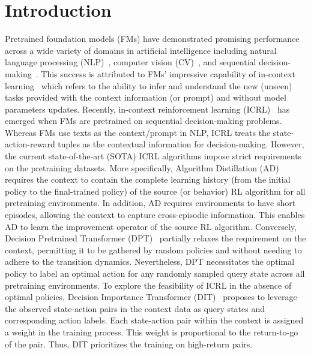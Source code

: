 \documentclass[10pt]{article}
\begin{document}
\section{Introduction}
Pretrained foundation models (FMs) have demonstrated promising performance across a wide variety of domains in artificial intelligence including natural language processing (NLP)~\citep{devlin2018bert, radford2018improving, radford2019language, brown2020language}, computer vision (CV)~\citep{yuan2021florence, sammani2022nlx, ma2023crepe, chen2024internvl}, and sequential decision-making~\citep{chen2021decision, janner2021offline, xu2022prompting, yang2023foundation, light2024strategist, light2024pianist}. This success is attributed to FMs' impressive capability of in-context learning~\citep{dong2022survey, li2023transformers, wei2023larger, wies2024learnability} which refers to the ability to infer and understand the new (unseen) tasks provided with the context information (or prompt) and without model parameters updates.
Recently, in-context reinforcement learning (ICRL)~\citep{laskin2022context, grigsby2023amago, lin2023transformers, sinii2023context, zisman2023emergence, lee2024supervised, lu2024structured, wang2024transformers, dong2024context} has emerged when FMs are pretrained on sequential decision-making problems.
Whereas FMs use texts as the context/prompt in NLP, ICRL treats the state-action-reward tuples as the contextual information for decision-making.
However, the current state-of-the-art (SOTA) ICRL algorithms impose strict requirements on the pretraining datasets. More specifically, Algorithm Distillation (AD)~\citep{laskin2022context} requires the context to contain the complete learning history (from the initial policy to the final-trained policy) of the source (or behavior) RL algorithm for all pretraining environments. In addition, AD requires environments to have short episodes, allowing the context to capture cross-episodic information. This enables AD to learn the improvement operator of the source RL algorithm.
Conversely, Decision Pretrained Transformer (DPT)~\citep{lee2024supervised} {partially relaxes the} requirement on the context, permitting it to be gathered by random policies and without needing to adhere to the transition dynamics. Nevertheless, DPT necessitates the optimal policy to label an optimal action for any randomly sampled query state across all pretraining environments.
To explore the feasibility of ICRL in the absence of optimal policies, Decision Importance Transformer (DIT)~\citep{dong2024context} proposes to leverage the observed state-action pairs in the context data as query states and corresponding action labels. Each state-action pair within the context is assigned a weight in the training process. This weight is proportional to the return-to-go of the pair. Thus, DIT prioritizes the training on high-return pairs.
\end{document}
